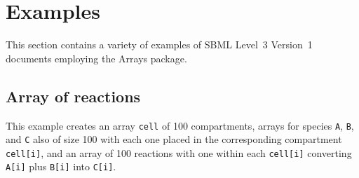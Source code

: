 %
\section{Examples}
\label{examples}

This section contains a variety of examples of SBML Level~3 Version~1
documents employing the Arrays package.

\subsection{Array of reactions}

This example creates an array {\tt cell} of 100 compartments, arrays for species {\tt A}, {\tt B}, and {\tt C} also of size 100 with each one placed in the corresponding compartment {\tt cell[i]}, and an array of 100 reactions with one within each {\tt cell[i]} converting {\tt A[i]} plus {\tt B[i]} into {\tt C[i]}.

